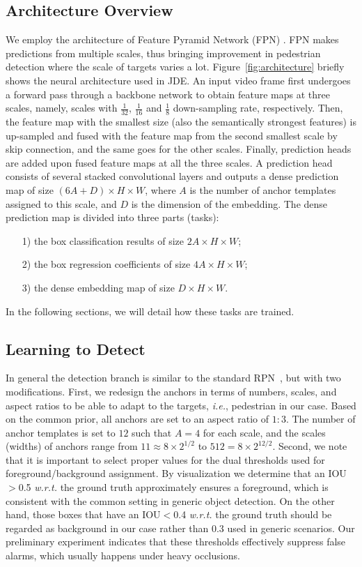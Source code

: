 \documentclass[runningheads]{llncs}
\def\ie{\textit{i.e.}}
\def\wrt{\textit{w.r.t. }}
\begin{document}
\subsection{Architecture Overview}
We employ the architecture of Feature Pyramid Network (FPN) \cite{fpn}. FPN makes predictions from multiple scales, thus bringing improvement in pedestrian detection where the scale of targets varies a lot. Figure~\ref{fig:architecture} briefly shows the neural architecture used in JDE. 
An input video frame first undergoes a forward pass through a backbone network to obtain feature maps at three scales, namely, scales with $\frac{1}{32}$, $\frac{1}{16}$ and $\frac{1}{8}$ down-sampling rate, respectively. Then, the feature map with the smallest size (also the semantically strongest features) is up-sampled and fused with the feature map from the second smallest scale by skip connection, and the same goes for the other scales. Finally, prediction heads are added upon fused feature maps at all the three scales. A prediction head consists of several stacked convolutional layers and outputs a dense prediction map of size $(6A+D)\times H\times W$, where $A$ is the number of anchor templates assigned to this scale, and $D$ is the dimension of the embedding. The dense prediction map is divided into three parts (tasks):
\begin{itemize}
    \item[1)] the box classification results of size $2A\times H\times W$;
    \item[2)] the box regression coefficients of size $4A\times H\times W$; 
    \item[3)] the dense embedding map of size $D\times H\times W$.
\end{itemize}

In the following sections, we will detail how these tasks are trained.

\subsection{Learning to Detect}
In general the detection branch is similar to the standard RPN~\cite{faster}, but with two modifications. First, we redesign the anchors in terms of numbers, scales, and aspect ratios to be able to adapt to the targets, \ie, pedestrian in our case. Based on the common prior, all anchors are set to an aspect ratio of $1:3$. The number of anchor templates is set to $12$ such that $A=4$ for each scale, and the scales (widths) of anchors range from $11 \approx 8\times2^{1/2}$ to $512=8\times2^{12/2}$.
Second, we note that it is important to select proper values for the dual thresholds used for  foreground/background assignment. By visualization we determine that an IOU$>$0.5 \wrt the ground truth approximately ensures a foreground, which is consistent with the common setting in generic object detection. On the other hand, those boxes that have an IOU$<$0.4 \wrt the ground truth should be regarded as background in our case rather than $0.3$ used in generic scenarios.
Our preliminary experiment indicates that these thresholds effectively suppress false alarms, which usually happens under heavy occlusions. 
\end{document}
